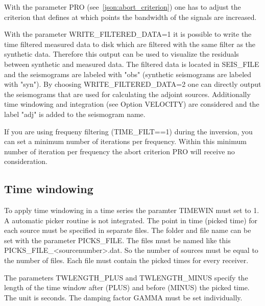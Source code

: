 With the parameter PRO (see~\ref{json:abort_criterion}) one has to adjust the criterion that defines at which points the bandwidth of the signals are increased.

With the parameter WRITE\_FILTERED\_DATA=1 it is possible to write the time filtered measured data to disk which are filtered with the same filter as the synthetic data. Therefore this output can be used to visualize the residuals between synthetic and measured data. The filtered data is located in SEIS\_FILE and the seismograms are labeled with "obs" (synthetic seismograms are labeled with "syn"). By choosing WRITE\_FILTERED\_DATA=2 one can directly output the seismograms that are used for calculating the adjoint sources. Additionally time windowing and integration (see Option VELOCITY) are considered and the label "adj" is added to the seismogram name.

If you are using frequeny filtering (TIME\_FILT==1) during the inversion, you can set a minimum number of iterations per frequency. Within this minimum number of iteration per frequency the abort criterion PRO will receive no consideration.

\subsection{Time windowing}
{\color{blue}{\begin{verbatim}
"Time windowing" : "comment",
			"TIMEWIN" : "0",
			"TW_IND" : "0",
			"PICKS_FILE" : "./picked_times/picks"
			"TWLENGTH_PLUS" : "0.01",
			"TWLENGTH_MINUS" : "0.01",
			"GAMMA" : "100000",
\end{verbatim}}}

{\color{red}{\begin{verbatim}
Default values are:
	TIMEWIN=0
\end{verbatim}}}

To apply time windowing in a time series the paramter TIMEWIN must set to 1. A automatic picker routine is not integrated. The point in time (picked time) for each source must be specified in separate files. The folder and file name can be set with the parameter PICKS\_FILE. The files must be named like this PICKS\_FILE\_<sourcenumber>.dat. So the number of sources must be equal to the number of files. Each file must contain the picked times for every receiver.

The parameters TWLENGTH\_PLUS and TWLENGTH\_MINUS specify the length of the time window after (PLUS) and before (MINUS) the picked time. The unit is seconds. The damping factor GAMMA must be set individually.

